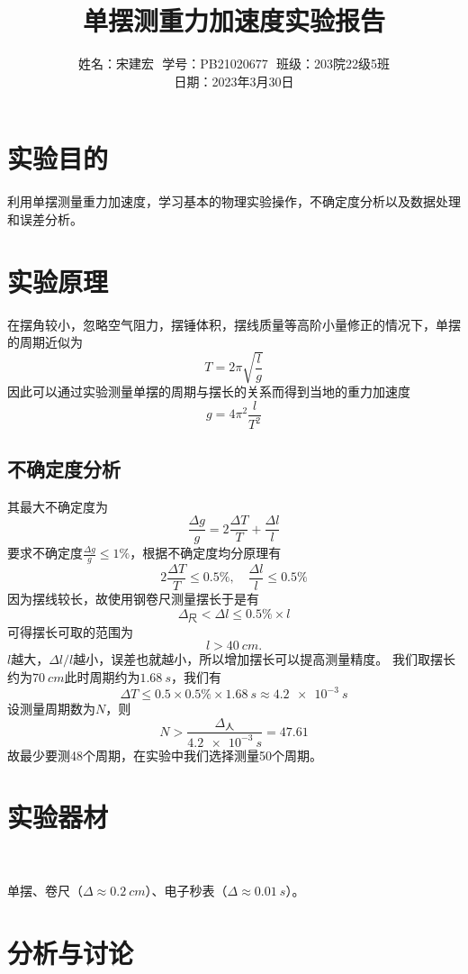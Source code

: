 \documentclass[12pt]{article}
\title{单摆测重力加速度实验报告}
\author{姓名：宋建宏\,\, 学号：PB21020677\,\, 班级：203院22级5班\\ 日期：2023年3月30日}
\date{}
\begin{document}
\maketitle
\section*{实验目的}
利用单摆测量重力加速度，学习基本的物理实验操作，不确定度分析以及数据处理和误差分析。

\section*{实验原理}
在摆角较小，忽略空气阻力，摆锤体积，摆线质量等高阶小量修正的情况下，单摆的周期近似为
\begin{equation*}
    T=2\pi\sqrt{\frac{l}{g}}
\end{equation*}
因此可以通过实验测量单摆的周期与摆长的关系而得到当地的重力加速度
\begin{equation*}
    g=4\pi^2\frac{l}{T^2}
\end{equation*}

\subsection*{不确定度分析}
其最大不确定度为
\begin{equation*}
    \frac{\Delta g}{g}=2\frac{\Delta T}{T}+\frac{\Delta l}{l}
\end{equation*}
要求不确定度$\frac{\Delta g}{g}\leq 1 \%$，根据不确定度均分原理有
$$
    2\frac{\Delta T}{T}\leq 0.5\%,\quad\frac{\Delta l}{l}\leq 0.5\%
$$
因为摆线较长，故使用钢卷尺测量摆长于是有
\[\Delta_{\text{尺}}<\Delta l\leq0.5\%\times l\]
可得摆长可取的范围为
\[l>\SI{40}{cm}.\]
$l$越大，$\Delta l/l$越小，误差也就越小，所以增加摆长可以提高测量精度。
我们取摆长约为$\SI{70}{cm}$此时周期约为$\SI{1.68}{s}$，我们有
\[\Delta T\leq 0.5\times 0.5\%\times \SI{1.68}{s}\approx\SI{4.2e-3}{s}\]
设测量周期数为$N$，则
\[N>\frac{\Delta_{\text{人}}}{\SI{4.2e-3}{s}}=47.61\]
故最少要测48个周期，在实验中我们选择测量50个周期。


\section*{实验器材}
\

单摆、卷尺（$\Delta\approx\SI{0.2}{cm}$）、电子秒表（\(\Delta \approx \SI{0.01}{s}\)）。
\newpage

\section*{分析与讨论}
\end{document}
